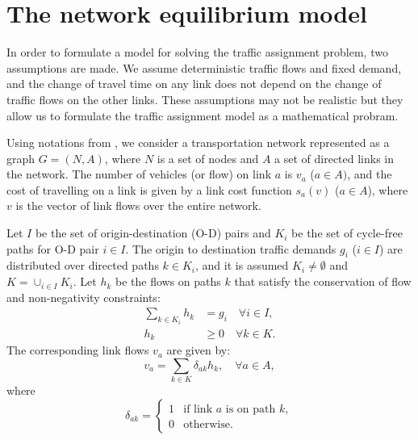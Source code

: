 \section{The network equilibrium model}
In order to formulate a model for solving the traffic assignment problem,
two assumptions are made.
We assume deterministic traffic flows and fixed demand,
and the change of travel time on any link does not depend on the change of traffic flows on the other links.
These assumptions may not be realistic  but they allow us to formulate the traffic assignment model as a mathematical probram.

Using notations from \citet{Florian, Florian2008},
we consider a transportation network represented as a graph $G = (N, A)$,
where $N$ is a set of nodes and $A$ a set of directed links in the network.
The number of vehicles (or flow) on link $a$ is $v_a$ ($a \in A)$,
and the cost of travelling on a link is given by a link cost function $s_a(v)$ ($a \in A$),
where $v$ is the vector of link flows over the entire network.

Let $I$ be the set of origin-destination (O-D) pairs
and $K_i$ be the set of cycle-free paths for O-D pair $i \in I$.
The origin to destination traffic demands $g_i$ ($i \in I$) are distributed over directed paths $k \in K_i$,
and it is assumed $K_i \neq \emptyset$ and $K = \cup_{i \in I} K_i$.
Let $h_k$ be the flows on paths $k$ that satisfy the conservation of flow and non-negativity constraints:
\begin{align} \label{model_1}
    \sum_{k \in K_i} h_k & = g_i \quad \forall i \in I,  \\
    h_k &\geq 0 \quad \forall k \in K.
\end{align}
The corresponding link flows $v_a$ are given by:
\begin{equation}
    v_a = \sum_{k \in K} \delta_{ak} h_k, \quad \forall a \in A,
\end{equation}
where
\begin{equation} \label{model_4}
    \delta_{ak} = 
    \begin{cases}
        1 & \text{if link $a$ is on path $k$},\\
        0 & \text{otherwise}.
    \end{cases}
\end{equation}

